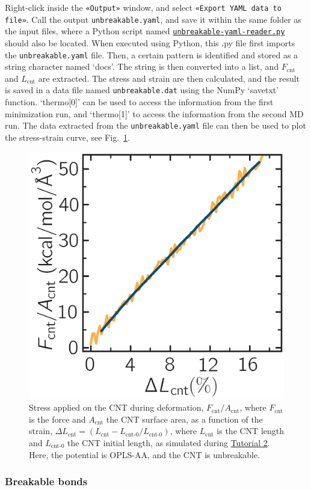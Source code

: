 \documentclass[9pt,tutorial]{livecoms}
\newcommand{\flecmd}[1]{\textcolor{command}{\texttt{#1}}} %
\newcommand{\guicmd}[1]{\textcolor{command}{\texttt{«#1»}}} %
\newcommand{\dwlcmd}[1]{\textcolor{download}{\texttt{#1}}} %
\newcommand{\filepath}{https://raw.githubusercontent.com/lammpstutorials/lammpstutorials-article/main/files/}
\begin{document}
Right-click inside the \guicmd{Output} window, and select
\guicmd{Export YAML data to file}.  Call the output \flecmd{unbreakable.yaml}, and save
it within the same folder as the input files, where a Python script named
\href{\filepath tutorial2/unbreakable-yaml-reader.py}{\dwlcmd{unbreakable-yaml-reader.py}} should also
be located.  When executed using Python, this .py file first imports
the \flecmd{unbreakable.yaml} file.  Then, a certain pattern is
identified and stored as a string character named `docs'.  The string is
then converted into a list, and $F_\text{cnt}$ and $L_\text{cnt}$
are extracted.  The stress and strain are then calculated, and the result
is saved in a data file named \flecmd{unbreakable.dat} using
the NumPy `savetxt' function.  `thermo[0]' can be used to access the
information from the first minimization run, and `thermo[1]' to access the
information from the second MD run.  The data extracted from
the \flecmd{unbreakable.yaml} file can then be used to plot the stress-strain
curve, see Fig.~\ref{fig:CNT-stress-strain-unbreakable}.

\begin{figure}
\centering
\includegraphics[width=0.55\linewidth]{CNT-unbreakable-stress-strain}
\caption{Stress applied on the CNT during deformation, $F_\text{cnt}/A_\text{cnt}$,
where $F_\text{cnt}$ is the force and $A_\text{cnt}$ the CNT surface area,
as a function of the strain, $\Delta L_\text{cnt} = (L_\text{cnt}-L_\text{cnt-0}/L_\text{cnt-0})$, where
$L_\text{cnt}$ is the CNT length and $L_\text{cnt-0}$ the CNT initial length,
as simulated during \hyperref[carbon-nanotube-label]{Tutorial 2}.
Here, the potential is OPLS-AA, and the CNT is unbreakable.}
\label{fig:CNT-stress-strain-unbreakable}
\end{figure}

\subsubsection{Breakable bonds}
\end{document}
